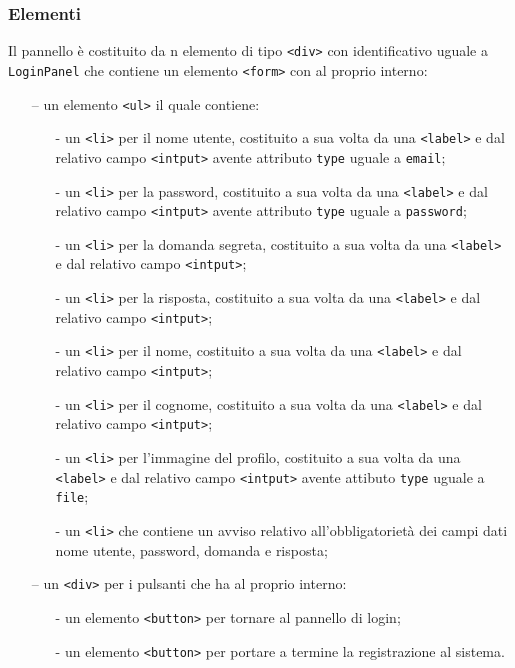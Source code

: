 \subsubsection*{Elementi}
Il pannello è costituito da n elemento di tipo \verb'<div>' con identificativo uguale a \verb'LoginPanel' che contiene un elemento \verb'<form>' con al proprio interno:
\begin{itemize}
  \item[--] un elemento \verb'<ul>' il quale contiene:
  \begin{itemize}
    \item[-] un \verb'<li>' per il nome utente, costituito a sua volta da una \verb'<label>' e dal relativo campo \verb'<intput>' avente attributo \verb'type' uguale a \verb'email';
    \item[-] un \verb'<li>' per la password, costituito a sua volta da una \verb'<label>' e dal relativo campo \verb'<intput>' avente attributo \verb'type' uguale a \verb'password';
    \item[-] un \verb'<li>' per la domanda segreta, costituito a sua volta da una \verb'<label>' e dal relativo campo \verb'<intput>';
    \item[-] un \verb'<li>' per la risposta, costituito a sua volta da una \verb'<label>' e dal relativo campo \verb'<intput>';
    \item[-] un \verb'<li>' per il nome, costituito a sua volta da una \verb'<label>' e dal relativo campo \verb'<intput>';
    \item[-] un \verb'<li>' per il cognome, costituito a sua volta da una \verb'<label>' e dal relativo campo \verb'<intput>';
    \item[-] un \verb'<li>' per l'immagine del profilo, costituito a sua volta da una \verb'<label>' e dal relativo campo \verb'<intput>' avente attibuto \verb'type' uguale a \verb'file';
    \item[-] un \verb'<li>' che contiene un avviso relativo all'obbligatorietà dei campi dati nome utente, password, domanda e risposta;
  \end{itemize}
  \item[--] un \verb'<div>' per i pulsanti che ha al proprio interno:
  \begin{itemize}
    \item[-] un elemento \verb'<button>' per tornare al pannello di login;
    \item[-] un elemento \verb'<button>' per portare a termine la registrazione al sistema.
  \end{itemize}
\end{itemize}

